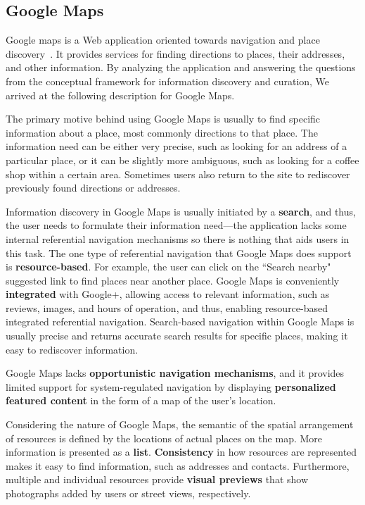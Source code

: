 \documentclass{sigchi}
\begin{document}
{{\subsection{Google Maps}
Google maps is a Web application oriented towards navigation and place discovery~\cite{gibson2006google}. It provides services for finding directions to places, their addresses, and other information. By analyzing the application and answering the questions from the conceptual framework for information discovery and curation, We arrived at the following description for Google Maps.

The primary motive behind using Google Maps is usually to find specific information about a place, most commonly directions to that place. The information need can be either very precise, such as looking for an address of a particular place, or it can be slightly more ambiguous, such as looking for a coffee shop within a certain area. Sometimes users also return to the site to rediscover previously found directions or addresses.

Information discovery in Google Maps is usually initiated by a \textbf{search}, and thus, the user needs to formulate their information need---the application lacks some internal referential navigation mechanisms so there is nothing that aids users in this task. The one type of referential navigation that Google Maps does support is \textbf{resource-based}. For example, the user can click on the ``Search nearby" suggested link to find places near another place. Google Maps is conveniently \textbf{integrated} with Google+, allowing access to relevant information, such as reviews, images, and hours of operation, and thus, enabling resource-based integrated referential navigation. Search-based navigation within Google Maps is usually precise and returns accurate search results for specific places, making it easy to rediscover information. 

Google Maps lacks \textbf{opportunistic navigation mechanisms}, and it provides limited support for system-regulated navigation by displaying \textbf{personalized featured content} in the form of a map of the user's location.  

Considering the nature of Google Maps, the semantic of the spatial arrangement of resources is defined by the locations of actual places on the map. More information is presented as a \textbf{list}. \textbf{Consistency} in how resources are represented makes it easy to find information, such as addresses and contacts. Furthermore, multiple and individual resources provide \textbf{visual previews} that show photographs added by users or street views, respectively.

}}
\end{document}
